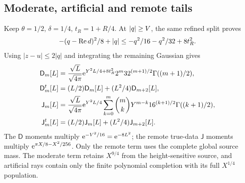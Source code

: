 \subsection{Moderate, artificial and remote tails}
\label{subsec:moving-tails}
Keep \(\theta=1/2\), \(\delta=1/4\), \(t_R=1+R/4\).
At \(\lvert q\rvert\ge V\), the same refined split proves
\[
 -(q-\operatorname{Re} d)^2/8+\lvert q\rvert
       \le-q^2/16-q^2/32+8t_R^2.
\]
Using \(|z-u|\le2|q|\) and integrating the remaining Gaussian gives
\begin{subequations}\label{eq:moving-tail-moments}
\begin{align}
 \mathsf D_m[L]&=\frac{\sqrt L}{\sqrt{4\pi}}
      \mathrm e^{Y^2L/4+8t_R^2}2^m32^{(m+1)/2}\Gamma((m+1)/2),\\
 \mathsf D_m^t[L]&=(L/2)\mathsf D_m[L]+(L^2/4)\mathsf D_{m+2}[L],\\
 \mathsf J_m[L]&=\frac{\sqrt L}{\sqrt{4\pi}}\mathrm e^{Y^2L/4}
       \sum_{k=0}^m\binom{m}{k}Y^{m-k}16^{(k+1)/2}
                                      \Gamma((k+1)/2),\\
 \mathsf J_m^t[L]&=(L/2)\mathsf J_m[L]+(L^2/4)\mathsf J_{m+2}[L].
\end{align}
\end{subequations}
The \(\mathsf D\) moments multiply
\(\mathrm e^{-V^2/16}=\mathrm e^{-8L^2}\); the remote true-data \(\mathsf J\)
moments multiply \(\mathrm e^{\pi X/8-X^2/256}\).
Only the remote term uses the complete global source mass. The moderate
term retains \(X^{9/4}\) from the height-sensitive source, and artificial
rays contain only the finite polynomial completion with its full
\(X^{1/4}\) population.

